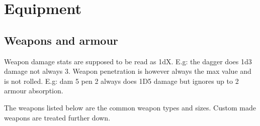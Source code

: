 


\cleardoublepage

\chapter*{Equipment}




\section*{Weapons and armour}

Weapon damage stats are supposed to be read as 1dX. E.g: the dagger does 1d3 damage not always 3. Weapon penetration is however always the max value and is not rolled. E.g: dam 5 pen 2 always does 1D5 damage but ignores up to 2 armour absorption.

The weapons listed below are the common weapon types and sizes. Custom made weapons are treated further down.



